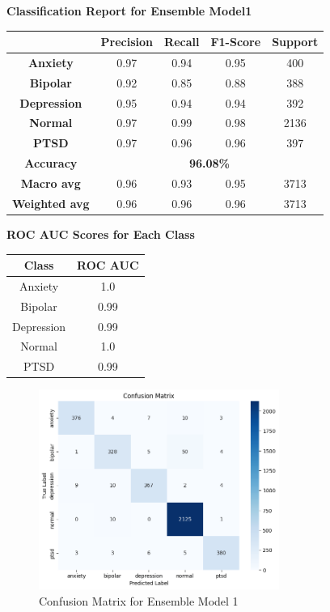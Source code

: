 \begin{center}
    \textbf{Classification Report for Ensemble Model1} \\[0.5em]
    \begin{tabular}{|c|c|c|c|c|}
        \hline
        & \textbf{Precision} & \textbf{Recall} & \textbf{F1-Score} & \textbf{Support} \\ \hline
        \textbf{Anxiety}    & 0.97 & 0.94 & 0.95 & 400  \\ \hline
        \textbf{Bipolar}    & 0.92 & 0.85 & 0.88 & 388  \\ \hline
        \textbf{Depression} & 0.95 & 0.94 & 0.94 & 392  \\ \hline
        \textbf{Normal}     & 0.97 & 0.99 & 0.98 & 2136 \\ \hline
        \textbf{PTSD}       & 0.97 & 0.96 & 0.96 & 397  \\ \hline
        \textbf{Accuracy}   & \multicolumn{4}{|c|}{\textbf{96.08\%}} \\ \hline
        \textbf{Macro avg}  & 0.96 & 0.93 & 0.95 & 3713 \\ \hline
        \textbf{Weighted avg} & 0.96 & 0.96 & 0.96 & 3713 \\ \hline
    \end{tabular}
\end{center}

\begin{center}
    \textbf{ROC AUC Scores for Each Class} \\[0.5em]
    \begin{tabular}{|c|c|}
        \hline
        \textbf{Class} & \textbf{ROC AUC} \\ \hline
        Anxiety  & 1.0 \\ \hline
        Bipolar  & 0.99 \\ \hline
        Depression & 0.99 \\ \hline
        Normal   & 1.0 \\ \hline
        PTSD     & 0.99 \\ \hline
    \end{tabular}
\end{center}

\begin{figure}[h!]  
    \centering
    \includegraphics[width=0.7\textwidth]{Images/EM CM.png}  
    \caption{Confusion Matrix for Ensemble Model 1}
    \label{dfdl3123}  %
\end{figure}

